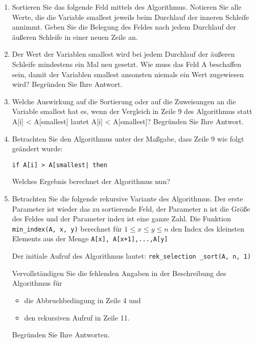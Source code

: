 \documentclass{lehramt-informatik-aufgabe}
\begin{document}
\begin{enumerate}

%

\item Sortieren Sie das folgende Feld mittels des Algorithmus. Notieren
Sie alle Werte, die die Variable smallest jeweils beim Durchlauf der
inneren Schleife annimmt. Geben Sie die Belegung des Feldes nach jedem
Durchlauf der äußeren Schleife in einer neuen Zeile an.

%

\item Der Wert der Variablen smallest wird bei jedem Durchlauf der
äußeren Schleife mindestens ein Mal neu gesetzt. Wie muss das Feld A
beschaffen sein, damit der Variablen smallest ansonsten niemals ein Wert
zugewiesen wird? Begründen Sie Ihre Antwort.

%

\item Welche Auswirkung auf die Sortierung oder auf die Zuweisungen an
die Variable smallest hat es, wenn der Vergleich in Zeile 9 des
Algorithmus statt A[i] < A[smallest] lautet A[i] < A[smallest]?
Begründen Sie Ihre Antwort.

%

\item Betrachten Sie den Algorithmus unter der Maßgabe, dass Zeile 9 wie
folgt geändert wurde:

\begin{verbatim}
if A[i] > A[smallest| then
\end{verbatim}

Welches Ergebnis berechnet der Algorithmus nun?

%

\item Betrachten Sie die folgende rekursive Variante des Algorithmus.
Der erste Parameter ist wieder das zu sortierende Feld, der Parameter
n ist die Größe des Feldes und der Parameter index ist eine ganze Zahl.
Die Funktion \texttt{min_index(A, x, y)} berechnet
für $1 \leq x \leq y \leq n$ den Index des kleinsten Elements aus der
Menge \texttt{{A[x], A[x+1],...,A[y]}}

Der initiale Aufruf des Algorithmus lautet:
\texttt{rek_selection _sort(A, n, 1)}

Vervollständigen Sie die fehlenden Angaben in der Beschreibung des
Algorithmus für

\begin{itemize}
\item die Abbruchbedingung in Zeile 4 und
\item den rekursiven Aufruf in Zeile 11.
\end{itemize}

Begründen Sie Ihre Antworten.
\end{enumerate}
\end{document}
